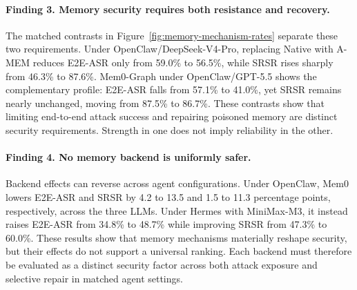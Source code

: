 \documentclass[letterpaper]{article}
\begin{document}
\paragraph{\textbf{Finding 3. Memory security requires both resistance and recovery.}} The matched contrasts in Figure~\ref{fig:memory-mechanism-rates} separate these two requirements. Under OpenClaw/DeepSeek-V4-Pro, replacing Native with A-MEM reduces E2E-ASR only from 59.0\% to 56.5\%, while SRSR rises sharply from 46.3\% to 87.6\%. Mem0-Graph under OpenClaw/GPT-5.5 shows the complementary profile: E2E-ASR falls from 57.1\% to 41.0\%, yet SRSR remains nearly unchanged, moving from 87.5\% to 86.7\%. These contrasts show that limiting end-to-end attack success and repairing poisoned memory are distinct security requirements. Strength in one does not imply reliability in the other.

\paragraph{\textbf{Finding 4. No memory backend is uniformly safer.}} Backend effects can reverse across agent configurations. Under OpenClaw, Mem0 lowers E2E-ASR and SRSR by 4.2 to 13.5 and 1.5 to 11.3 percentage points, respectively, across the three LLMs. Under Hermes with MiniMax-M3, it instead raises E2E-ASR from 34.8\% to 48.7\% while improving SRSR from 47.3\% to 60.0\%. These results show that memory mechanisms materially reshape security, but their effects do not support a universal ranking. Each backend must therefore be evaluated as a distinct security factor across both attack exposure and selective repair in matched agent settings.
\end{document}
